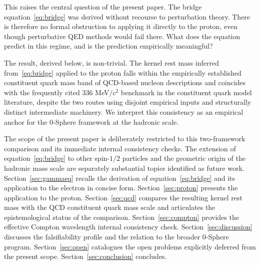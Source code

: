 \documentclass[%
 reprint, amsmath,amssymb, aps, prc, ]{revtex4-2}
\numberwithin{equation}{section}
\begin{document}
This raises the central question of the present paper.
The bridge equation~\eqref{eq:bridge} was derived without recourse to perturbation theory.
There is therefore no formal obstruction to applying it directly to the proton, even though perturbative QED methods would fail there.
What does the equation predict in this regime, and is the prediction empirically meaningful?

The result, derived below, is non-trivial.
The kernel rest mass inferred from~\eqref{eq:bridge} applied to the proton falls within the empirically established constituent quark mass band of QCD-based nucleon descriptions and coincides with the frequently cited $336$ MeV$/c^2$ benchmark in the constituent quark model literature, despite the two routes using disjoint empirical inputs and structurally distinct intermediate machinery.
We interpret this consistency as an empirical anchor for the 0-Sphere framework at the hadronic scale.

The scope of the present paper is deliberately restricted to this two-framework comparison and its immediate internal consistency checks.
The extension of equation~\eqref{eq:bridge} to other spin-$1/2$ particles and the geometric origin of the hadronic mass scale are separately substantial topics identified as future work.
Section~\ref{sec:gammaeq} recalls the derivation of equation~\eqref{eq:bridge} and its application to the electron in concise form.
Section~\ref{sec:proton} presents the application to the proton.
Section~\ref{sec:qcd} compares the resulting kernel rest mass with the QCD constituent quark mass scale and articulates the epistemological status of the comparison.
Section~\ref{sec:compton} provides the effective Compton wavelength internal consistency check.
Section~\ref{sec:discussion} discusses the falsifiability profile and the relation to the broader 0-Sphere program.
Section~\ref{sec:open} catalogues the open problems explicitly deferred from the present scope.
Section~\ref{sec:conclusion} concludes.
\end{document}
